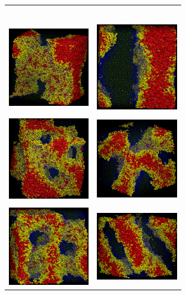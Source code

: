 \documentclass[
journal=mamobx,
manuscript=article,
]{achemso}
\begin{document}
\begin{figure}
	\centering
	\begin{tabular}{C{1.6in}@{}C{1.6in}}
		  \textcolor{white}{} & \textcolor{white}{Flory-type} \\
		  \\
		 \includegraphics[width=1.4in]{A5B5_030} & \includegraphics[width=1.4in]{A5B5_Flory_030} \\
		  \\
		 \includegraphics[width=1.4in]{A5B5_050} & \includegraphics[width=1.4in]{A5B5_Flory_050} \\
    	  \\ \includegraphics[width=1.4in]{A5B5_055} & \includegraphics[width=1.4in]{A5B5_Flory_055} \\

\end{tabular}
\end{figure}
\end{document}
